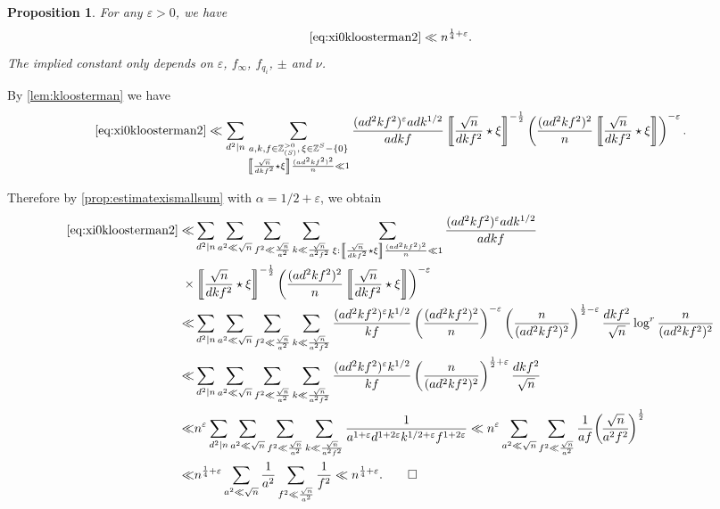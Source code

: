 \documentclass[10pt,oneside,reqno]{amsart}
\makeatletter
\newcommand\ZZ{\mathbb{Z}}
\newcommand\legendresymbol[2]{\genfrac{(}{)}{}{}{#1}{#2}}
\theoremstyle{THEOREM}
\newtheorem{proposition}[theorem]{Proposition}
\theoremstyle{DEFINITION}
\theoremstyle{EXERCISE}
\numberwithin{equation}{section}
\renewenvironment{proof}[1][\proofname]{\par
  \vspace{-6pt}
  \pushQED{\qed}
  \normalfont \topsep6\p@\@plus6\p@\relax
  \trivlist
  \item[\hskip\labelsep\rmfamily\bfseries
    #1\@addpunct{:}]\ignorespaces
}{
  \popQED\endtrivlist\@endpefalse
  \vspace{-6pt}
}
\makeatother
\begin{document}
\begin{proposition}\label{prop:xi0kloosterman2}
For any $\varepsilon>0$, we have
\[
\eqref{eq:xi0kloosterman2}\ll n^{\frac14+\varepsilon}.
\]
The implied constant only depends on $\varepsilon$, $f_\infty$, $f_{q_i}$, $\pm$ and $\nu$.
\end{proposition}
\begin{proof}
By \autoref{lem:kloosterman} we have
\[
   \eqref{eq:xi0kloosterman2}\ll  \sum_{d^2\mid n}\sum_{\substack{a,k,f\in \ZZ_{(S)}^{>0},\,\xi\in \ZZ^S-\{0\}\\\left\llbracket\frac{\sqrt{n}}{dkf^2}\star \xi\right\rrbracket\frac {(ad^2kf^2)^2}{n} \ll 1}}\frac{(ad^2kf^2)^\varepsilon adk^{1/2}}{adkf}\left\llbracket\frac{\sqrt{n}}{dkf^2}\star \xi\right\rrbracket^{-\frac 12}\left(\frac{(ad^2kf^2)^2}{n}\left\llbracket\frac{\sqrt{n}}{dkf^2}\star \xi\right\rrbracket\right)^{-\varepsilon}.
\]

Therefore by \autoref{prop:estimatexismallsum} with $\alpha=1/2+\varepsilon$, we obtain
\begin{align*}
   \eqref{eq:xi0kloosterman2}\ll & \sum_{d^2\mid n}\sum_{a^2\ll \sqrt{n}}\sum_{f^2\ll \frac{\sqrt{n}}{a^2}}\sum_{k\ll \frac{\sqrt{n}}{a^2f^2}}\sum_{\xi:\left\llbracket\frac{\sqrt{n}}{dkf^2}\star \xi\right\rrbracket\frac {(ad^2kf^2)^2}{n} \ll 1}\frac{(ad^2kf^2)^\varepsilon adk^{1/2}}{adkf}\\
\times&\left\llbracket\frac{\sqrt{n}}{dkf^2}\star \xi\right\rrbracket^{-\frac 12}\left(\frac{(ad^2kf^2)^2}{n}\left\llbracket\frac{\sqrt{n}}{dkf^2}\star \xi\right\rrbracket\right)^{-\varepsilon} \\
\ll & \sum_{d^2\mid n}\sum_{a^2\ll \sqrt{n}}\sum_{f^2\ll \frac{\sqrt{n}}{a^2}}\sum_{k\ll \frac{\sqrt{n}}{a^2f^2}}\frac{(ad^2kf^2)^\varepsilon k^{1/2}}{kf}\left(\frac{(ad^2kf^2)^2}{n}\right)^{ -\varepsilon}\left(\frac{n}{(ad^2kf^2)^2}\right)^{\frac 12-\varepsilon}\frac{dkf^2}{\sqrt{n}}\log^r\frac{n}{(ad^2kf^2)^2}\\
\ll& \sum_{d^2\mid n}\sum_{a^2\ll \sqrt{n}}\sum_{f^2\ll \frac{\sqrt{n}}{a^2}}\sum_{k\ll \frac{\sqrt{n}}{a^2f^2}}\frac{(ad^2kf^2)^{\varepsilon} k^{1/2}}{kf}\left(\frac{n}{(ad^2kf^2)^2}\right)^{\frac 12+\varepsilon}\frac{dkf^2}{\sqrt{n}}\\
\ll & n^{\varepsilon}\sum_{d^2\mid n}\sum_{a^2\ll \sqrt{n}}\sum_{f^2\ll \frac{\sqrt{n}}{a^2}}\sum_{k\ll \frac{\sqrt{n}}{a^2f^2}} 
\frac{1}{a^{1+\varepsilon} d^{1+2\varepsilon} k^{1/2+\varepsilon}f^{1+2\varepsilon}}\ll n^{\varepsilon}\sum_{a^2\ll \sqrt{n}}\sum_{f^2\ll \frac{\sqrt{n}}{a^2}}\frac{1}{af} \legendresymbol{\sqrt{n}}{a^2f^2}^{\frac12}\\
\ll & n^{\frac 14+\varepsilon} \sum_{a^2\ll \sqrt{n}}\frac{1}{a^2}\sum_{f^2\ll \frac{\sqrt{n}}{a^2}}\frac{1}{f^2}
\ll n^{\frac14+\varepsilon}.\qedhere
\end{align*}
\end{proof}
\end{document}
